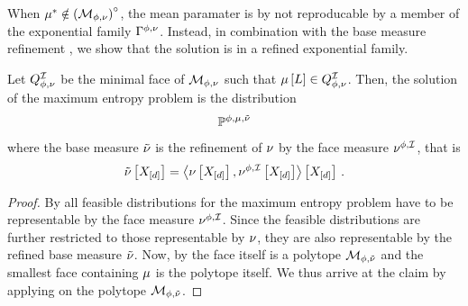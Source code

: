 When $\mu^*\notin{\left(\mathcal{M}_{\phi,\nu}\right)}^{\circ}$, the mean paramater is by  not reproducable by a member of the exponential family $\Gamma^{\phi,\nu}$.
Instead, in combination with the base measure refinement , we show that the solution is in a refined exponential family.

\begin{theorem}\label{the:maxEntropyFace}
    Let $Q^{\mathcal{I}}_{\phi,\nu}$ be the minimal face of $\mathcal{M}_{\phi,\nu}$ such that $\mu\left[L\right]\in Q^{\mathcal{I}}_{\phi,\nu}$.
    Then, the solution of the maximum entropy problem is the distribution
    \begin{align*}
        \mathbb{P}^{\phi,\mu,\tilde{\nu}}
    \end{align*}
    where the base measure $\tilde{\nu}$ is the refinement of $\nu$ by the face measure $\nu^{\phi,\mathcal{I}}$, that is
    \begin{align*}
        \tilde{\nu}\left[X_{[d]}\right] = \left\langle \nu\left[X_{[d]}\right],\nu^{\phi,\mathcal{I}}\left[X_{[d]}\right]\right\rangle \left[ X_{[d]} \right] \, .
    \end{align*}
\end{theorem}
\begin{proof}
    By  all feasible distributions for the maximum entropy problem have to be representable by the face measure $\nu^{\phi,\mathcal{I}}$.
    Since the feasible distributions are further restricted to those representable by $\nu$, they are also representable by the refined base measure $\tilde{\nu}$.
    Now, by  the face itself is a polytope $\mathcal{M}_{\phi,\tilde{\nu}}$ and the smallest face containing $\mu$ is the polytope itself.
    We thus arrive at the claim by applying  on the polytope $\mathcal{M}_{\phi,\tilde{\nu}}$.
\end{proof}


